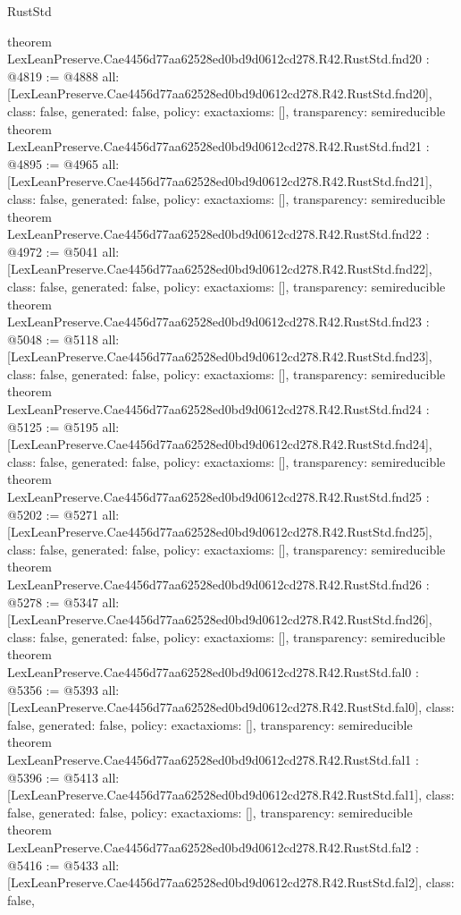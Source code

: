 \begin{lexlean}{RustStd}
\begin{coremodule}
{}
theorem LexLeanPreserve.Cae4456d77aa62528ed0bd9d0612cd278.R42.RustStd.fnd20 : @4819 := @4888 {
  all: [LexLeanPreserve.Cae4456d77aa62528ed0bd9d0612cd278.R42.RustStd.fnd20],
  class: false,
  generated: false,
  policy: exact{axioms: []},
  transparency: semireducible
}
theorem LexLeanPreserve.Cae4456d77aa62528ed0bd9d0612cd278.R42.RustStd.fnd21 : @4895 := @4965 {
  all: [LexLeanPreserve.Cae4456d77aa62528ed0bd9d0612cd278.R42.RustStd.fnd21],
  class: false,
  generated: false,
  policy: exact{axioms: []},
  transparency: semireducible
}
theorem LexLeanPreserve.Cae4456d77aa62528ed0bd9d0612cd278.R42.RustStd.fnd22 : @4972 := @5041 {
  all: [LexLeanPreserve.Cae4456d77aa62528ed0bd9d0612cd278.R42.RustStd.fnd22],
  class: false,
  generated: false,
  policy: exact{axioms: []},
  transparency: semireducible
}
theorem LexLeanPreserve.Cae4456d77aa62528ed0bd9d0612cd278.R42.RustStd.fnd23 : @5048 := @5118 {
  all: [LexLeanPreserve.Cae4456d77aa62528ed0bd9d0612cd278.R42.RustStd.fnd23],
  class: false,
  generated: false,
  policy: exact{axioms: []},
  transparency: semireducible
}
theorem LexLeanPreserve.Cae4456d77aa62528ed0bd9d0612cd278.R42.RustStd.fnd24 : @5125 := @5195 {
  all: [LexLeanPreserve.Cae4456d77aa62528ed0bd9d0612cd278.R42.RustStd.fnd24],
  class: false,
  generated: false,
  policy: exact{axioms: []},
  transparency: semireducible
}
theorem LexLeanPreserve.Cae4456d77aa62528ed0bd9d0612cd278.R42.RustStd.fnd25 : @5202 := @5271 {
  all: [LexLeanPreserve.Cae4456d77aa62528ed0bd9d0612cd278.R42.RustStd.fnd25],
  class: false,
  generated: false,
  policy: exact{axioms: []},
  transparency: semireducible
}
theorem LexLeanPreserve.Cae4456d77aa62528ed0bd9d0612cd278.R42.RustStd.fnd26 : @5278 := @5347 {
  all: [LexLeanPreserve.Cae4456d77aa62528ed0bd9d0612cd278.R42.RustStd.fnd26],
  class: false,
  generated: false,
  policy: exact{axioms: []},
  transparency: semireducible
}
theorem LexLeanPreserve.Cae4456d77aa62528ed0bd9d0612cd278.R42.RustStd.fal0 : @5356 := @5393 {
  all: [LexLeanPreserve.Cae4456d77aa62528ed0bd9d0612cd278.R42.RustStd.fal0],
  class: false,
  generated: false,
  policy: exact{axioms: []},
  transparency: semireducible
}
theorem LexLeanPreserve.Cae4456d77aa62528ed0bd9d0612cd278.R42.RustStd.fal1 : @5396 := @5413 {
  all: [LexLeanPreserve.Cae4456d77aa62528ed0bd9d0612cd278.R42.RustStd.fal1],
  class: false,
  generated: false,
  policy: exact{axioms: []},
  transparency: semireducible
}
theorem LexLeanPreserve.Cae4456d77aa62528ed0bd9d0612cd278.R42.RustStd.fal2 : @5416 := @5433 {
  all: [LexLeanPreserve.Cae4456d77aa62528ed0bd9d0612cd278.R42.RustStd.fal2],
  class: false,
}
\end{coremodule}
\end{lexlean}
